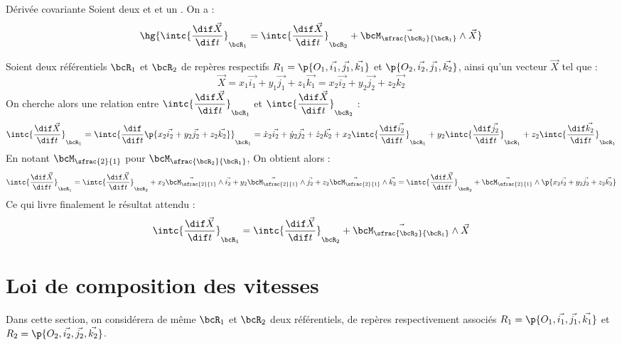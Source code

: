     \begin{property}{Dérivée covariante}{}
        Soient deux  et  et un . On a :
        \[ \hg{\intc{\dfrac{\dif \vec X}{\dif t}}_{\bcR_1} = \intc{\dfrac{\dif \vec X}{\dif t}}_{\bcR_2} + \vec{\bcM_{\sfrac{\bcR_2}{\bcR_1}}} \land \vec{X}}\]
    \end{property}
    \begin{nproof}
        Soient deux référentiels $\bcR_1$ et $\bcR_2$ de repères respectifs $R_1 = \p{O_1, \vec{i_1}, \vec{j_1}, \vec{k_1}}$ et $\p{O_2, \vec{i_2}, \vec{j_1}, \vec{k_2}}$, ainsi qu'un vecteur $\vec X$ tel que :
        \[ \vec X = x_1 \vec{i_1} + y_1 \vec{j_1} + z_1 \vec{k_1}
        = x_2 \vec{i_2} + y_2 \vec{j_2} + z_2 \vec{k_2}\]
        On cherche alors une relation entre $\intc{\dfrac{\dif \vec X}{\dif t}}_{\bcR_1}$ et $\intc{\dfrac{\dif \vec X}{\dif t}}_{\bcR_2}$ :
        \[
            \intc{\dfrac{\dif \vec X}{\dif t}}_{\bcR_1} = \intc{\dfrac{\dif}{\dif t}\p{x_2\vec{i_2} + y_2\vec{j_2} + z_2\vec{k_2}}}_{\bcR_1} = \dot x_2\vec{i_2} + \dot y_2\vec{j_2} + \dot z_2\vec{k_2} + x_2\intc{\dfrac{\dif \vec{i_2}}{\dif t}}_{\bcR_1} + y_2\intc{\dfrac{\dif \vec{j_2}}{\dif t}}_{\bcR_1} + z_2\intc{\dfrac{\dif \vec{k_2}}{\dif t}}_{\bcR_1}
        \]
        En notant $\bcM_{\sfrac{2}{1}}$ pour $\bcM_{\sfrac{\bcR_2}{\bcR_1}}$, On obtient alors :
        \[ \intc{\dfrac{\dif \vec X}{\dif t}}_{\bcR_1} = \intc{\dfrac{\dif \vec X}{\dif t}}_{\bcR_2} + x_2 \vec{\bcM_{\sfrac{2}{1}}} \wedge \vec{i_2} + y_2 \vec{\bcM_{\sfrac{2}{1}}} \wedge \vec{j_2} + z_2 \vec{\bcM_{\sfrac{2}{1}}} \wedge \vec{k_2} = \intc{\dfrac{\dif \vec X}{\dif t}}_{\bcR_2} + \vec{\bcM_{\sfrac{2}{1}}} \wedge \p{x_2 \vec{i_2} + y_2 \vec{j_2} + z_2 \vec{k_2}}\]
        Ce qui livre finalement le résultat attendu :
        \[ \intc{\dfrac{\dif \vec X}{\dif t}}_{\bcR_1} = \intc{\dfrac{\dif \vec X}{\dif t}}_{\bcR_2} + \vec{\bcM_{\sfrac{\bcR_2}{\bcR_1}}} \land \vec{X}\]
    \end{nproof}

    
    \section{Loi de composition des vitesses}
    
    Dans cette section, on considérera de même $\bcR_1$ et $\bcR_2$ deux référentiels, de repères respectivement associés $R_1 = \p{O_1, \vec{i_1}, \vec{j_1}, \vec{k_1}}$ et $R_2 = \p{O_2, \vec{i_2}, \vec{j_2}, \vec{k_2}}$.
    
